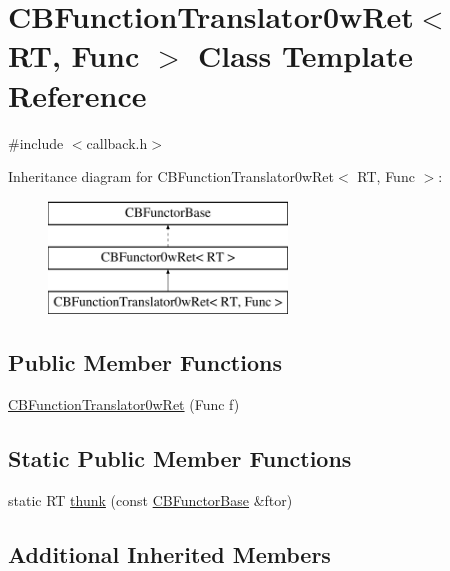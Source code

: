 \hypertarget{class_c_b_function_translator0w_ret}{\section{C\+B\+Function\+Translator0w\+Ret$<$ R\+T, Func $>$ Class Template Reference}
\label{class_c_b_function_translator0w_ret}
}


{\ttfamily \#include $<$callback.\+h$>$}

Inheritance diagram for C\+B\+Function\+Translator0w\+Ret$<$ R\+T, Func $>$\+:\begin{figure}[H]
\begin{center}
\leavevmode
\includegraphics[height=3.000000cm]{class_c_b_function_translator0w_ret}
\end{center}
\end{figure}
\subsection*{Public Member Functions}
\begin{DoxyCompactItemize}
\item 
\hyperlink{class_c_b_function_translator0w_ret_a47476a9784c6b5ee86181c17c3846a5b}{C\+B\+Function\+Translator0w\+Ret} (Func f)
\end{DoxyCompactItemize}
\subsection*{Static Public Member Functions}
\begin{DoxyCompactItemize}
\item 
static R\+T \hyperlink{class_c_b_function_translator0w_ret_a212480259869fd827e7159e6f986b909}{thunk} (const \hyperlink{class_c_b_functor_base}{C\+B\+Functor\+Base} \&ftor)
\end{DoxyCompactItemize}
\subsection*{Additional Inherited Members}


